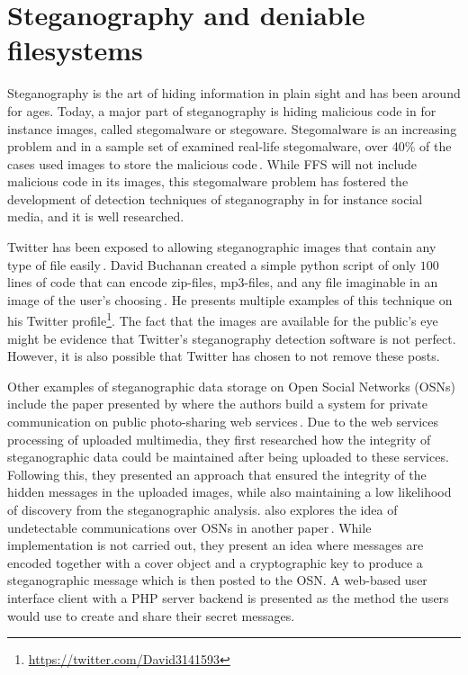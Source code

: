 \section{Steganography and deniable filesystems}
Steganography is the art of hiding information in plain sight and has been around for ages. Today, a major part of steganography is hiding malicious code in for instance images, called stegomalware or stegoware. Stegomalware is an increasing problem and in a sample set of examined real-life stegomalware, over 40\% of the cases used images to store the malicious code\,\cite{stichtingcuingfoundationSIMARGLStegwarePrimer2020}. While FFS will not include malicious code in its images, this stegomalware problem has fostered the development of detection techniques of steganography in for instance social media, and it is well researched. 

Twitter has been exposed to allowing steganographic images that contain any type of file easily\,\cite{TwitterImagesCan}. David Buchanan created a simple python script of only $100$ lines of code that can encode zip-files, mp3-files, and any file imaginable in an image of the user's choosing\,\cite{buchananTweetablepolyglotpng2022}. He presents multiple examples of this technique on his Twitter profile\footnote{\url{https://twitter.com/David3141593}}. The fact that the images are available for the public's eye might be evidence that Twitter's steganography detection software is not perfect. However, it is also possible that Twitter has chosen to not remove these posts.

Other examples of steganographic data storage on Open Social Networks (\gls{OSN}s) include the paper presented by \citeauthor{ningSecretMessageSharing2014} where the authors build a system for private communication on public photo-sharing web services\,\cite{ningSecretMessageSharing2014}. Due to the web services processing of uploaded multimedia, they first researched how the integrity of steganographic data could be maintained after being uploaded to these services. Following this, they presented an approach that ensured the integrity of the hidden messages in the uploaded images, while also maintaining a low likelihood of discovery from the steganographic analysis. \citeauthor{beatoUndetectableCommunicationOnline2014} also explores the idea of undetectable communications over OSNs in another paper\,\cite{beatoUndetectableCommunicationOnline2014}. While implementation is not carried out, they present an idea where messages are encoded together with a cover object and a cryptographic key to produce a steganographic message which is then posted to the OSN. A web-based user interface client with a PHP server backend is presented as the method the users would use to create and share their secret messages.

